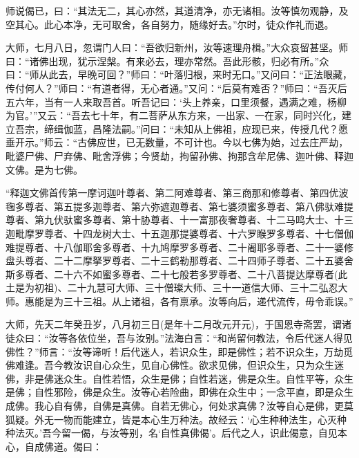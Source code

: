 \documentclass[UTF8, 11pt, oneside]{ctexart}
\begin{document}
师说偈已，曰：“其法无二，其心亦然，其道清净，亦无诸相。汝等慎勿观静，及空其心。此心本净，无可取舍，各自努力，随缘好去。”尔时，徒众作礼而退。

大师，七月八日，忽谓门人曰：“吾欲归新州，汝等速理舟楫。”大众哀留甚坚。师曰：“诸佛出现，犹示涅槃。有来必去，理亦常然。吾此形骸，归必有所。”众曰：“师从此去，早晚可回？”师曰：“叶落归根，来时无口。”又问曰：“正法眼藏，传付何人？”师曰：“有道者得，无心者通。”又问：“后莫有难否？”师曰：“吾灭后五六年，当有一人来取吾首。听吾记曰：‘头上养亲，口里须餐，遇满之难，杨柳为官。’”又云：“吾去七十年，有二菩萨从东方来，一出家、一在家，同时兴化，建立吾宗，缔缉伽蓝，昌隆法嗣。”问曰：“未知从上佛祖，应现已来，传授几代？愿垂开示。”师云：“古佛应世，已无数量，不可计也。今以七佛为始，过去庄严劫，毗婆尸佛、尸弃佛、毗舍浮佛；今贤劫，拘留孙佛、拘那含牟尼佛、迦叶佛、释迦文佛。是为七佛。

“释迦文佛首传第一摩诃迦叶尊者、第二阿难尊者、第三商那和修尊者、第四优波毱多尊者、第五提多迦尊者、第六弥遮迦尊者、第七婆须蜜多尊者、第八佛驮难提尊者、第九伏驮蜜多尊者、第十胁尊者、十一富那夜奢尊者、十二马鸣大士、十三迦毗摩罗尊者、十四龙树大士、十五迦那提婆尊者、十六罗睺罗多尊者、十七僧伽难提尊者、十八伽耶舍多尊者、十九鸠摩罗多尊者、二十阇耶多尊者、二十一婆修盘头尊者、二十二摩拏罗尊者、二十三鹤勒那尊者、二十四师子尊者、二十五婆舍斯多尊者、二十六不如蜜多尊者、二十七般若多罗尊者、二十八菩提达摩尊者(此土是为初祖)、二十九慧可大师、三十僧璨大师、三十一道信大师、三十二弘忍大师。惠能是为三十三祖。从上诸祖，各有禀承。汝等向后，递代流传，毋令乖误。”

大师，先天二年癸丑岁，八月初三日(是年十二月改元开元)，于国恩寺斋罢，谓诸徒众曰：“汝等各依位坐，吾与汝别。”法海白言：“和尚留何教法，令后代迷人得见佛性？”师言：“汝等谛听！后代迷人，若识众生，即是佛性；若不识众生，万劫觅佛难逢。吾今教汝识自心众生，见自心佛性。欲求见佛，但识众生，只为众生迷佛，非是佛迷众生。自性若悟，众生是佛；自性若迷，佛是众生。自性平等，众生是佛；自性邪险，佛是众生。汝等心若险曲，即佛在众生中；一念平直，即是众生成佛。我心自有佛，自佛是真佛。自若无佛心，何处求真佛？汝等自心是佛，更莫狐疑。外无一物而能建立，皆是本心生万种法。故经云：‘心生种种法生，心灭种种法灭。’吾今留一偈，与汝等别，名‘自性真佛偈’。后代之人，识此偈意，自见本心，自成佛道。偈曰：
\end{document}
